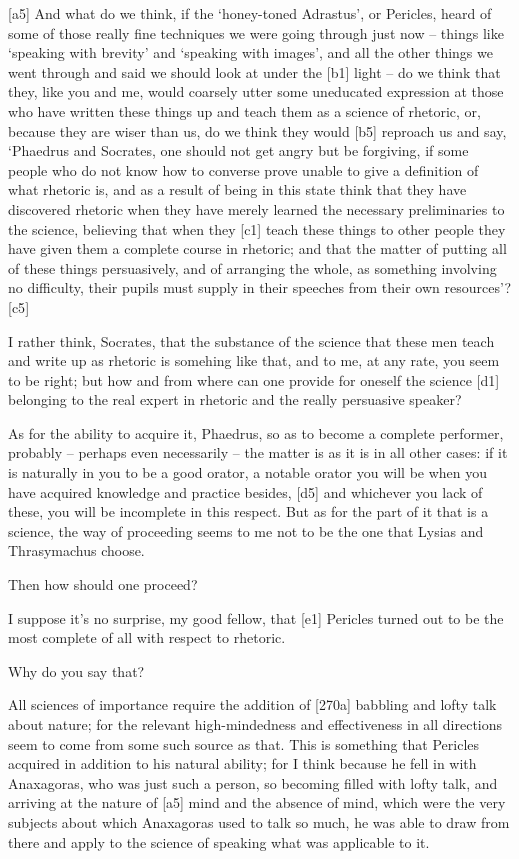 {[}a5{]}  And what do we think, if the ‘honey-toned Adrastus',
or Pericles, heard of
some of those really fine techniques we were going through just now --
things like ‘speaking with brevity' and ‘speaking with images', and all
the other things we went through and said we should look at under the
{[}b1{]} light -- do we think that they, like you and me, would coarsely
utter some uneducated expression at those who have written these things
up and teach them as a science of rhetoric, or, because they are wiser
than us, do we think they would {[}b5{]} reproach us and say, ‘Phaedrus
and Socrates, one should not get angry but be forgiving, if some people
who do not know how to
converse prove unable to
give a definition of what rhetoric is, and as a result of being in this
state think that they have discovered rhetoric when they have merely
learned the necessary preliminaries to the science, believing that when
they {[}c1{]} teach these things to other people they have given them a
complete course in rhetoric; and that the matter of putting all of these
things persuasively, and of arranging the whole, as something involving
no difficulty, their pupils must supply in their speeches from their own
resources'? {[}c5{]}

 I rather think, Socrates, that the substance of the science
that these men teach and write up as rhetoric is somehing like that, and
to me, at any rate, you seem to be right; but how and from where can one
provide for oneself the science {[}d1{]} belonging to the real expert in
rhetoric and the really persuasive speaker?

 As for the ability to acquire it, Phaedrus, so as to become a
complete performer, probably -- perhaps even necessarily -- the matter
is as it is in all other cases: if it is naturally in you to be a good
orator, a notable orator you will be when you have acquired knowledge
and practice besides, {[}d5{]} and whichever you lack of these, you will
be incomplete in this respect. But as for the part of it that is a
science, the way of proceeding seems to me not to be the one that Lysias
and Thrasymachus choose.

 Then how should one proceed?

 I suppose it's no surprise, my good fellow, that {[}e1{]}
Pericles turned out to be the most complete of all with respect to
rhetoric.

 Why do you say that?

 All sciences of importance require the addition of {[}270a{]}
babbling and lofty talk
about nature; for the relevant high-mindedness and effectiveness in all
directions seem to come from some such source as that. This is something
that Pericles acquired in addition to his natural ability; for I think
because he fell in with Anaxagoras, who was just such a person, so
becoming filled with lofty talk, and arriving at the nature of {[}a5{]}
mind and the absence of mind, which were the very subjects about which
Anaxagoras used to talk
so much, he was able to draw from there and apply to the science of
speaking what was applicable to it.

